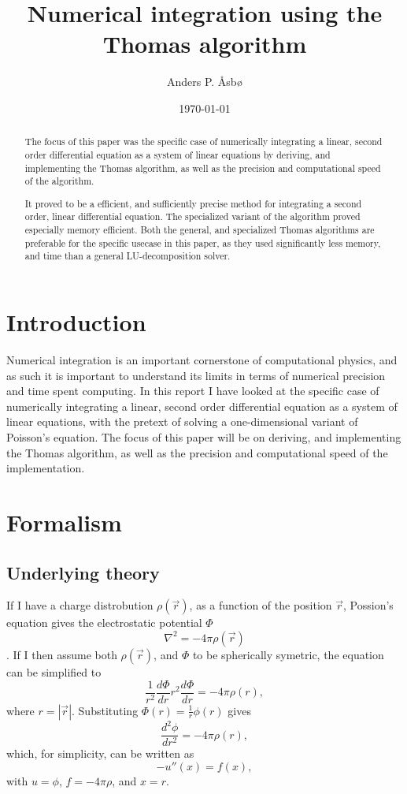 \documentclass[english,notitlepage,reprint]{revtex4-1}  %
\begin{document}
\title{Numerical integration using the Thomas algorithm}   %
\author{Anders P. Åsbø}               %
\date{\today}
\noaffiliation                            %

\begin{abstract}
The focus of this paper was the specific case of numerically integrating a linear, second order differential equation as a system of linear equations by deriving, and implementing the Thomas algorithm\citep{Datta2010}, as well as the precision and computational speed of the algorithm.

It proved to be a efficient, and sufficiently precise method for integrating a second order, linear differential equation. The specialized variant of the algorithm proved especially memory efficient. Both the general, and specialized Thomas algorithms are preferable for the specific usecase in this paper, as they used significantly less memory, and time than a general LU-decomposition solver.
\end{abstract}

\maketitle
\tableofcontents

\section{Introduction}\label{sec:1}
Numerical integration is an important cornerstone of computational physics, and as such it is important to understand its limits in terms of numerical precision and time spent computing. In this report I have looked at the specific case of numerically integrating a linear, second order differential equation as a system of linear equations, with the pretext of solving a one-dimensional variant of Poisson's equation. The focus of this paper will be on deriving, and implementing the Thomas algorithm\citep{Datta2010}, as well as the precision and computational speed of the implementation.

\section{Formalism}\label{sec:2}
\subsection{Underlying theory}\label{subsec:21}
If I have a charge distrobution \(\rho(\vec{r})\), as a function of the position \(\vec{r}\), Possion's equation gives the electrostatic potential \(\Phi\)
$$
	\nabla^{2}=-4\pi\rho(\vec{r})
$$
\citep{DepartmentofPhysics2019}. If I then assume both \(\rho(\vec{r})\), and \(\Phi\) to be spherically symetric, the equation can be simplified to
$$
	\frac{1}{r^{2}}\frac{d\Phi}{dr}r^{2}\frac{d\Phi}{dr}=-4\pi\rho(r),
$$
where \(r=|\vec{r}|\). Substituting \(\Phi(r)=\frac{1}{r}\phi(r)\) gives
$$
	\frac{d^{2}\phi}{dr^{2}}=-4\pi\rho(r),
$$
which, for simplicity, can be written as
$$
	-u''(x)=f(x),
$$
with \(u = \phi\), \(f=-4\pi\rho\), and \(x = r\)\citep{DepartmentofPhysics2019}.
\end{document}
